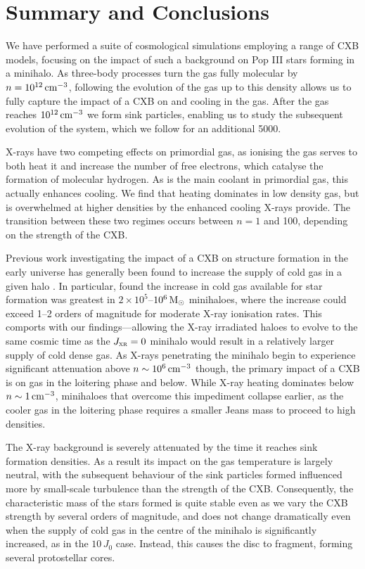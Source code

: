 \documentclass[../thesis.tex]{subfiles}
\begin{document}
\section{Summary and Conclusions}
\label{conclusions}
We have performed a suite of cosmological simulations employing a range of CXB models, focusing on the impact of such a background on Pop III stars forming in a minihalo.  As three-body processes turn the gas fully molecular by $n=10^{12}\,\mathrm{cm}^{-3}$, following the evolution of the gas up to this density allows us to fully capture the impact of a CXB on \htwo and \hd cooling in the gas.  After the gas reaches $10^{12}\,\mathrm{cm}^{-3}$ we form sink particles, enabling us to study the subsequent evolution of the system, which we follow for an additional 5000\yr.

X-rays have two competing effects on primordial gas, as ionising the gas serves to both heat it and increase the number of free electrons, which catalyse the formation of molecular hydrogen.  As \htwo is the main coolant in primordial gas, this actually enhances cooling.  We find that heating dominates in low density gas, but is overwhelmed at higher densities by the enhanced cooling X-rays provide.  The transition between these two regimes occurs between $n=1$ and 100\cc, depending on the strength of the CXB.  

Previous work investigating the impact of a CXB on structure formation in the early universe has generally been found to increase the supply of cold gas in a given halo \citep{HaimanAbelRees2000, VenkatesanGirouxShull2001, GloverBrand2003, Cen2003, KuhlenMadau2005, Jeonetal2012}.  In particular, \citet{KuhlenMadau2005} found the increase in cold gas available for star formation was greatest in $2\times10^5$--$10^6\,\mathrm{M}_{\odot}$ minihaloes, where the increase could exceed 1--2 orders of magnitude for moderate X-ray ionisation rates. This comports with our findings---allowing the X-ray irradiated haloes to evolve to the same cosmic time as the $J_{\textsc{xr}}=0$ minihalo would result in a relatively larger supply of cold dense gas. As X-rays penetrating the minihalo begin to experience significant attenuation above $n\sim10^6\,\mathrm{cm}^{-3}$ though, the primary impact of a CXB is on gas in the loitering phase and below. While X-ray heating dominates below $n\sim 1\,\mathrm{cm}^{-3}$, minihaloes that overcome this impediment collapse earlier, as the cooler gas in the loitering phase requires a smaller Jeans mass to proceed to high densities.  

The X-ray background is severely attenuated by the time it reaches sink formation densities. As a result its impact on the gas temperature is largely neutral, with the subsequent behaviour of the sink particles formed influenced more by small-scale  turbulence than the strength of the CXB.  Consequently, the characteristic mass of the stars formed is quite stable even as we vary the CXB strength by several orders of magnitude, and does not change dramatically even when the supply of cold gas in the centre of the minihalo is significantly increased, as in the $10\,J_0$ case.  Instead, this causes the disc to fragment, forming several protostellar cores.
\end{document}
